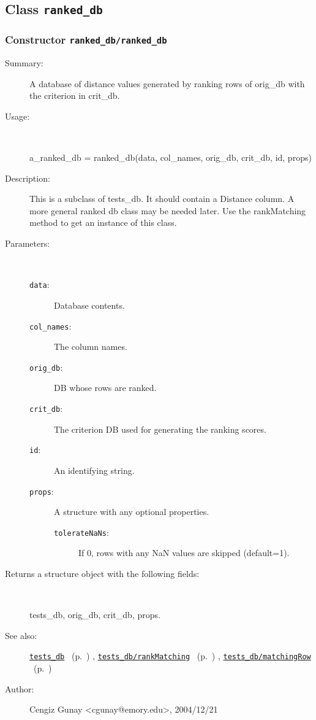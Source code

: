 \subsection{Class \texttt{ranked\_db}}%
%
\label{ref_ranked_db}%
\hypertarget{ref_ranked_db}{}%
\subsubsection[Constructor \texttt{ranked\_db}]{Constructor \texttt{ranked\_db/ranked\_db}}%
%
\label{ref_ranked_db__ranked_db}%
\hypertarget{ref_ranked_db__ranked_db}{}%
\begin{description}
\item[Summary:]A database of distance values generated by ranking rows of orig\_db with the criterion in crit\_db.
%
\item[Usage:]~%
\begin{lyxcode}%
a\_ranked\_db = ranked\_db(data, col\_names, orig\_db, crit\_db, id, props)
%
\end{lyxcode}%
%
\item[Description:]%
This is a subclass of tests\_db. It should contain a Distance column. A
 more general ranked db class may be needed later. Use the rankMatching method
 to get an instance of this class.
\item[Parameters:]~
\begin{description}%
\item[\texttt{data}:]
 Database contents.
\item[\texttt{col\_names}:]
 The column names.
\item[\texttt{orig\_db}:]
 DB whose rows are ranked.
\item[\texttt{crit\_db}:]
 The criterion DB used for generating the ranking scores.
\item[\texttt{id}:]
 An identifying string.
\item[\texttt{props}:]
 A structure with any optional properties.
\begin{description}%
\item[\texttt{tolerateNaNs}:]
 If 0, rows with any NaN values are skipped (default=1).
\end{description}%
\end{description}%
%
\item[Returns a structure object with the following fields:
]~

	tests\_db, orig\_db, crit\_db, props.
%
%
\item[See also:]%
\hyperlink{ref_tests_db}{\texttt{tests\_db}}%
\ (p.~\pageref{ref_tests_db})%
%
, \hyperlink{ref_tests_db__rankMatching}{\texttt{tests\_db/rankMatching}}%
\ (p.~\pageref{ref_tests_db__rankMatching})%
%
, \hyperlink{ref_tests_db__matchingRow}{\texttt{tests\_db/matchingRow}}%
\ (p.~\pageref{ref_tests_db__matchingRow})%
%
%
\item[Author:]%
Cengiz Gunay <cgunay@emory.edu>, 2004/12/21
%
\end{description}
\methodline%
